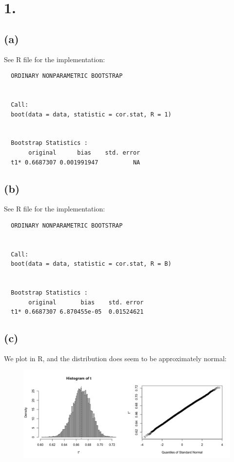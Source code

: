 \documentclass{article}
\begin{document}
\thispagestyle{firstpageheader}

\section*{1.}
{\Large 



\subsection*{(a)}

See R file for the implementation: \\
\begin{verbatim}
  ORDINARY NONPARAMETRIC BOOTSTRAP


  Call:
  boot(data = data, statistic = cor.stat, R = 1)
  
  
  Bootstrap Statistics :
       original      bias    std. error
  t1* 0.6687307 0.001991947          NA
\end{verbatim}

\subsection*{(b)}

See R file for the implementation: \\
\begin{verbatim}
  ORDINARY NONPARAMETRIC BOOTSTRAP


  Call:
  boot(data = data, statistic = cor.stat, R = B)
  
  
  Bootstrap Statistics :
       original       bias    std. error
  t1* 0.6687307 6.870455e-05  0.01524621
\end{verbatim}

\subsection*{(c)}

We plot in R, and the distribution does seem to be approximately normal:
\begin{figure}[h!]
  \centering
  \includegraphics[width=500pt]{hw6_1c.png}
\end{figure}

}
\end{document}
